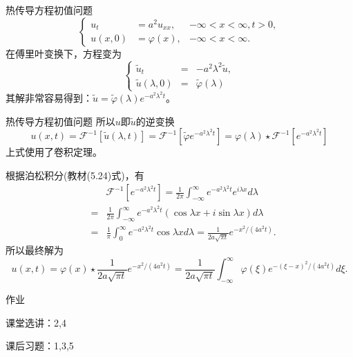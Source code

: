 \documentclass[11pt]{beamer}
\newcommand{\kong}[1][0.5]{\vspace{#1cm}}
\begin{document}
\begin{frame}{热传导方程初值问题}
\begin{equation}
\left\{
\begin{aligned}
u_t &= a^2 u_{xx},  &-\infty < x < \infty, t>0, \\
u(x,0) &= \varphi(x), &-\infty < x < \infty.
\end{aligned}
\right.
\end{equation}
在傅里叶变换下，方程变为
\begin{equation}
\left\{
\begin{aligned}
\tilde{u}_t &=& -a^2 \lambda^2 \tilde{u}, \\
\tilde{u}(\lambda, 0) &=& \tilde{\varphi}(\lambda)
\end{aligned}
\right.
\end{equation}
其解非常容易得到：$\tilde{u} = \tilde{\varphi}(\lambda) e^{-a^2 \lambda^2 t}$。
\end{frame}

\begin{frame}{热传导方程初值问题}
所以$u$即$\tilde{u}$的逆变换
\begin{equation}
u(x,t) = \mathscr{F}^{-1}[ \tilde{u}(\lambda,t) ]
= \mathscr{F}^{-1}[ \tilde{\varphi} e^{-a^2 \lambda^2 t} ]
= \varphi(\lambda) \star \mathscr{F}^{-1}[ e^{-a^2 \lambda^2 t} ]
\end{equation}
上式使用了卷积定理。

根据泊松积分(教材(5.24)式)，有
\begin{eqnarray}
&& \mathscr{F}^{-1}[ e^{-a^2 \lambda^2 t} ] = \frac{1}{2\pi} \int^\infty_{-\infty} e^{-a^2 \lambda^2 t} e^{i\lambda x} d\lambda
\nonumber\\
&=& \frac{1}{2\pi} \int^\infty_{-\infty} e^{-a^2 \lambda^2 t} ( \cos \lambda x + i \sin \lambda x) d \lambda
\nonumber\\
&=& \frac{1}{\pi} \int^\infty_0 e^{-a^2 \lambda^2 t} \cos \lambda x d \lambda
= \frac{1}{2a \sqrt{\pi t}} e^{-x^2/(4a^2t)}.
\end{eqnarray}
所以最终解为
\begin{equation}
u(x,t) = \varphi(x) \star \frac{1}{2a \sqrt{\pi t}} e^{-x^2/(4a^2t)}
= \frac{1}{2a \sqrt{\pi t}} \int^\infty_{-\infty} \varphi(\xi) e^{-(\xi-x)^2/(4a^2t)} d\xi.
\end{equation}
\end{frame}

\begin{frame}{作业}

\kong[0.5]
课堂选讲：2,4

\kong[0.5]
课后习题：1,3,5

\kong[1]
\end{frame}
\end{document}
